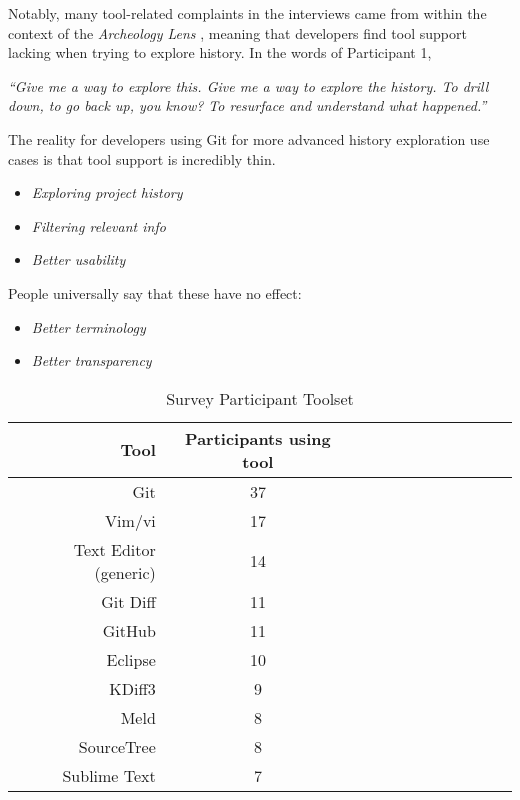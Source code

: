 
Notably, many tool-related complaints in the interviews came from within the context of the \textit{Archeology Lens} \cite{mihai_lenses}, meaning that developers find tool support lacking when trying to explore history. In the words of Participant 1, 

\begin{displayquote}
\textit{``Give me a way to explore this. Give me a way to explore the history. To drill down, to go back up, you know? To resurface and understand what happened.''}
\end{displayquote}

The reality for developers using Git for more advanced history exploration use cases is that tool support is incredibly thin.


\begin{itemize}
	\item \textit{Exploring project history}\\
	\item \textit{Filtering relevant info}\\
	\item \textit{Better usability}\\
\end{itemize}

People universally say that these have no effect:
\begin{itemize}
	\item \textit{Better terminology}\\
	\item \textit{Better transparency}\\
\end{itemize}

\begin{table}[!]
\renewcommand{\arraystretch}{1.3}
\caption{Survey Participant Toolset}
\label{survey_toolset}
\centering
\begin{tabularx}{0.45\textwidth}{@{}r|*{10}{C}c@{}}
\toprule
Tool & Participants using tool\\
\midrule
Git	& 37\\
Vim/vi & 17\\
Text Editor (generic) & 14\\
Git Diff & 11\\
GitHub & 11\\
Eclipse & 10\\
KDiff3 & 9\\
Meld & 8\\
SourceTree & 8\\
Sublime Text & 7\\
\bottomrule
\end{tabularx}
\end{table}